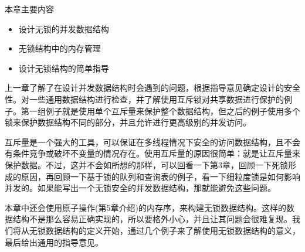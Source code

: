 
本章主要内容

\begin{itemize}
    \item 设计无锁的并发数据结构
    \item 无锁结构中的内存管理
    \item 设计无锁结构的简单指导
\end{itemize}

上一章了解了在设计并发数据结构时会遇到的问题，根据指导意见确定设计的安全性。对一些通用数据结构进行检查，并了解使用互斥锁对共享数据进行保护的例子。第一组例子就是使用单个互斥量来保护整个数据结构，但之后的例子使用多个锁来保护数据结构不同的部分，并且允许进行更高级别的并发访问。

互斥量是一个强大的工具，可以保证在多线程情况下安全的访问数据结构，且不会有条件竞争或破坏不变量的情况存在。使用互斥量的原因很简单：就是让互斥量来保护数据。不过，这并不会如所想的那样，可以回看一下第3章，回顾一下死锁形成的原因，再回顾一下基于锁的队列和查询表的例子，看一下细粒度锁是如何影响并发的。如果能写出一个无锁安全的并发数据结构，那就能避免这些问题。

本章中还会使用原子操作(第5章介绍)的内存序，来构建无锁数据结构。这样的数据结构不是那么容易正确实现的，所以要格外小心，并且让其问题会很难复现。我们将从无锁数据结构的定义开始，通过几个例子来了解使用无锁数据结构的意义，最后给出通用的指导意见。